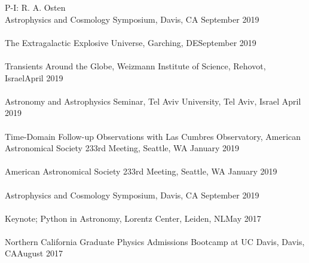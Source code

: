 \documentclass[10pt]{cv}
\begin{document}
\begin{llist}
P-I: R. A. Osten\\%
\vspace{-0.1in}  
Astrophysics and Cosmology Symposium, Davis, CA \hfill September 2019\\\vspace{-0.1in}  
\\
The Extragalactic Explosive Universe, Garching, DE\hfill September 2019\\ \vspace{-0.1in}  
\\
Transients Around the Globe, Weizmann Institute of Science, Rehovot, Israel\hfill April 2019\\ \vspace{-0.1in}  %
\\
Astronomy and Astrophysics Seminar, Tel Aviv University, Tel Aviv, Israel \hfill April 2019\\ \vspace{-0.1in}  %
\\
Time-Domain Follow-up Observations with Las Cumbres Observatory, American Astronomical Society 233rd Meeting, Seattle, WA  \hfill January 2019\\ \vspace{-0.1in}  %
\\
American Astronomical Society 233rd Meeting,  Seattle, WA \hfill January 2019\\\vspace{-0.1in}  
\\
Astrophysics and Cosmology Symposium, Davis, CA \hfill September 2019\\\vspace{-0.1in}  
\\
Keynote; Python in Astronomy, Lorentz Center, Leiden, NL\hfill May 2017\\ \vspace{-0.1in}  %
\\
Northern California Graduate Physics Admissions Bootcamp at UC Davis, Davis, CA\hfill August 2017\\ \vspace{-0.1in}  %

\end{llist}
\end{document}
